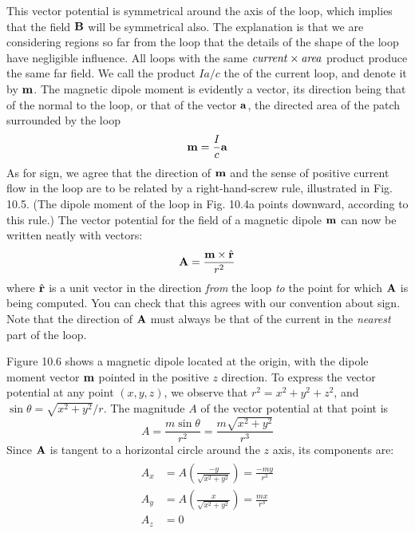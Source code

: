 This vector potential is symmetrical around the axis of the loop,
which implies that the field $\mathbf{B}$ will be symmetrical also. The explanation
is that we are considering regions so far from the loop that the
details of the shape of the loop have negligible influence. All loops
with the same $\text{\emph{current}} \times \text{\emph{area}}$ product produce the same far field.
We call the product $Ia/c$ the  of the current
loop, and denote it by $\mathbf{m}$. The magnetic dipole moment is evidently
a vector, its direction being that of the normal to the loop, or that
of the vector $\mathbf{a}$, the directed area of the patch surrounded by the loop
\begin{equation}
  \mathbf{m} = \frac{I}{c}\mathbf{a}
\end{equation}
As for sign, we agree that the direction of $\mathbf{m}$ and the sense of positive
current flow in the loop are to be related by a right-hand-screw rule,
illustrated in Fig. 10.5. (The dipole moment of the loop in Fig. 10.4a
points downward, according to this rule.) The vector potential for
the field of a magnetic dipole $\mathbf{m}$ can now be written neatly with
vectors:
\begin{equation}
  \mathbf{A} = \frac{\mathbf{m}\times\hat{\mathbf{r}}}{r^2}
\end{equation}
where $\hat{\mathbf{r}}$ is a unit vector in the direction \emph{from} the loop \emph{to} the point for
which $\mathbf{A}$ is being computed. You can check that this agrees with
our convention about sign. Note that the direction of $\mathbf{A}$ must always
be that of the current in the \emph{nearest} part of the loop.

Figure 10.6 shows a magnetic dipole located at the origin, with the
dipole moment vector $\mathbf{m}$ pointed in the positive $z$ direction. To express
the vector potential at any point $(x,y,z)$, we observe that
$r^2 = x^2 + y^2 + z^2$, and $\sin\theta=\sqrt{x^2 + y^2}/r$. The magnitude $A$ of
the vector potential at that point is
\begin{equation}
  A = \frac{m\sin\theta}{r^2} = \frac{m\sqrt{x^2 + y^2}}{r^3}
\end{equation}
Since $\mathbf{A}$ is tangent to a horizontal circle around the $z$ axis, its components
are:
\begin{align}
\begin{split}
  A_x &= A \left(\frac{-y}{\sqrt{x^2+y^2}}\right) = \frac{-my}{r^3} \\
  A_y &= A \left(\frac{x}{\sqrt{x^2+y^2}}\right) = \frac{mx}{r^3} \\
  A_z &= 0
\end{split}
\end{align}

